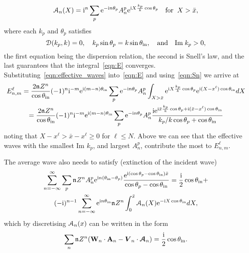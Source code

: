 \documentclass[12pt, a4paper]{article}
\begin{document}
\begin{equation}
  \mathcal A_n(X) = \textrm{i}^n \sum_p \textrm{e}^{-\textrm{i} n \theta_p} A_{n}^p \textrm{e}^{\textrm{i} X \frac{k_p}{k} \cos \theta_p } \quad \text{for} \;\; X > \bar x ,
\label{eqn:effective_waves}
\end{equation}
where each $k_p$ and $\theta_p$ satisfies
\begin{equation}
  \mathcal D(k_p,k) =0, \quad  k_p \sin \theta_p = k \sin \theta_{\mathrm{in}}, \quad \text{and} \quad \text{Im} \;  k_p > 0,
\end{equation}
the first equation being the dispersion relation, the second is Snell's law, and the last guarantees that the integral~\eqref{eqn:E} converges.
 Substituting~\eqref{eqn:effective_waves} into~\eqref{eqn:E} and using~\eqref{eqn:Sn} we arrive at
\begin{multline}
  E_{n,m}^\ell  = \frac{2 \mathfrak n_{} Z^n}{\cos \theta_{\mathrm{in}}} (-1)^n \textrm{i}^{-m} \textrm{e}^{\textrm{i} (m-n) \theta_{\mathrm{in}}}
   \sum_p \textrm{e}^{-\textrm{i} n \theta_p} A_{n}^p \int_{X>\bar x} \textrm{e}^{\textrm{i} X \frac{k_p}{k} \cos \theta_p}
  \textrm{e}^{\textrm{i} (X-x^\ell) \cos \theta_{\mathrm{in}} }
   dX
   \\
   = \frac{2 \mathfrak n_{} Z^n }{\cos \theta_{\mathrm{in}}} (-1)^n \textrm{i}^{-m}\textrm{e}^{\textrm{i} (m-n) \theta_{\mathrm{in}}}
    \sum_p \textrm{e}^{-\textrm{i} n \theta_p} A_{n}^p
    \frac{\textrm{i} \textrm{e}^{\textrm{i} \bar x \frac{k_p}{k} \cos \theta_p + \textrm{i} (\bar x - x^\ell) \cos \theta_{\mathrm{in}}}}{k_p/k \cos \theta_p + \cos \theta_{\mathrm{in}}}
\end{multline}
noting that $ X -x^\ell > \bar x - x^\ell \geq 0 $ for $\ell \leq N$. Above we can see that the effective waves with the smallest Im $k_p$, and largest $A_n^p$, contribute the most to $E_{n,m}^\ell$.

The average wave also needs to satisfy (extinction of the incident wave)
\begin{multline}
  \sum_{n=-\infty}^\infty \sum_{p} \mathfrak n_{} Z^n  A_n^p \textrm{e}^{\textrm{i} n(\theta_{\mathrm{in}}-\theta_p)}  \frac{\textrm{e}^{\textrm{i} (\cos \theta_p-\cos \theta_{\mathrm{in}}){\bar x}}}{\cos \theta_p-\cos \theta_{\mathrm{in}}}
 = \frac{\textrm{i} }{2} \cos \theta_{\mathrm{in}} +
 \\
   (-\textrm{i})^{n-1} \sum_{n=-\infty}^\infty \textrm{e}^{\textrm{i} n \theta_{\mathrm{in}}} \mathfrak n_{} Z^n
  \int_{0}^{{\bar x}} \mathcal A_n(X)  \textrm{e}^{-\textrm{i} X \cos \theta_{\mathrm{in}} }d X,
\end{multline}
which by discretising $\mathcal A_n(x)$ can be written in the form
\begin{equation}
\sum_n  \mathfrak n_{ } Z^n ( \mathbf W_n \cdot \mathbf A_n - \boldsymbol{V}_n \cdot \boldsymbol{\mathcal A}_n )  = \frac{\textrm{i} }{2} \cos \theta_{\mathrm{in}}.
\end{equation}
\end{document}

